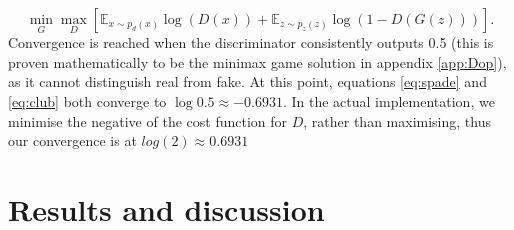 \documentclass[12pt,a4paper]{article}
\begin{document}
\begin{equation}\label{eq:gan}
\min_G\max_D[\mathbb{E}_{x \sim p_d(x)}\log(D(x)) + \mathbb{E}_{z \sim p_z(z)}\log(1-D(G(z)))]. 
\end{equation}
Convergence is reached when the discriminator consistently outputs 0.5 (this is proven mathematically to be the minimax game solution in appendix \ref{app:Dop}), as it cannot distinguish real from fake. At this point, equations \ref{eq:spade} and \ref{eq:club} both converge to $\log{0.5} \approx -0.6931$. In the actual implementation, we minimise the negative of the cost function for $D$, rather than maximising, thus our convergence is at $log(2) \approx 0.6931$
\pagebreak
\section{Results and discussion}
\end{document}
